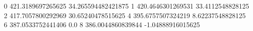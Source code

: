 0 421.3189697265625 34.265594482421875
1 420.4646301269531 33.4112548828125
2 417.7057800292969 30.65240478515625
4 395.6757507324219 8.62237548828125
6 387.0533752441406 0.0
8 386.0044860839844 -1.04888916015625
